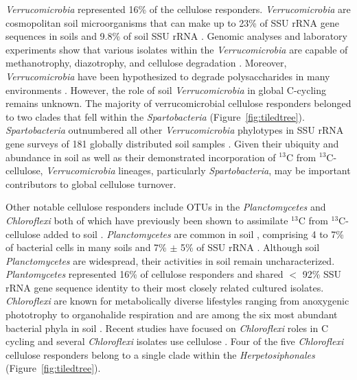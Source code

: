 \textit{Verrucomicrobia} represented 16\% of the cellulose responders.
\textit{Verrucomicrobia} are cosmopolitan soil microorganisms \citep{Bergmann_2011}
that can make up to 23\% of SSU rRNA gene sequences in soils
\citep{Bergmann_2011} and 9.8\% of soil SSU rRNA \citep{Buckley_2001}. Genomic
analyses and laboratory experiments show that various isolates within the
\textit{Verrucomicrobia} are capable of methanotrophy, diazotrophy, and
cellulose degradation \citep{Wertz_2011,Otsuka_2012}. Moreover,
\textit{Verrucomicrobia} have been hypothesized to degrade polysaccharides in
many environments \citep{Fierer_2013,10543821,Herlemann_2013}. However, the
role of soil \textit{Verrucomicrobia} in global C-cycling remains unknown. The
majority of verrucomicrobial cellulose responders belonged to two clades that
fell within the \textit{Spartobacteria} (Figure~\ref{fig:tiledtree}).
\textit{Spartobacteria} outnumbered all other \textit{Verrucomicrobia}
phylotypes in SSU rRNA gene surveys of 181 globally distributed soil samples
\citep{Bergmann_2011}. Given their ubiquity and abundance
in soil as well as their demonstrated incorporation of $^{13}$C from
$^{13}$C-cellulose, \textit{Verrucomicrobia} lineages, particularly
\textit{Spartobacteria}, may be important contributors to global cellulose
turnover. 

Other notable cellulose responders include OTUs in the \textit{Planctomycetes}
and \textit{Chloroflexi} both of which have previously been shown to
assimilate $^{13}$C from $^{13}$C-cellulose added to soil
\citep{Schellenberger_2010}. \textit{Planctomycetes} are common in soil
\citep{Janssen2006}, comprising 4 to 7\% of bacterial cells in many soils
\citep{Zarda_1997,Chatzinotas_1998} and 7\% $\pm$ 5\% of SSU rRNA
\citep{buckley_2003}. Although soil \textit{Planctomycetes} are widespread,
their activities in soil remain uncharacterized. \textit{Plantomycetes}
represented 16\% of cellulose responders and shared $<$ 92\% SSU rRNA gene
sequence identity to their most closely related cultured isolates.
\textit{Chloroflexi} are known for metabolically diverse lifestyles ranging
from anoxygenic phototrophy to organohalide respiration \citep{Hug_2013} and
are among the six most abundant bacterial phyla in soil \citep{Janssen2006}.
Recent studies have focused on \textit{Chloroflexi} roles in C cycling
\citep{Hug_2013,Goldfarb_2011,Cole_2013} and several \textit{Chloroflexi}
isolates use cellulose \citep{Hug_2013,Goldfarb_2011,Cole_2013}. Four of the
five \textit{Chloroflexi} cellulose responders belong to a single clade within
the \textit{Herpetosiphonales} (Figure~\ref{fig:tiledtree}). 

